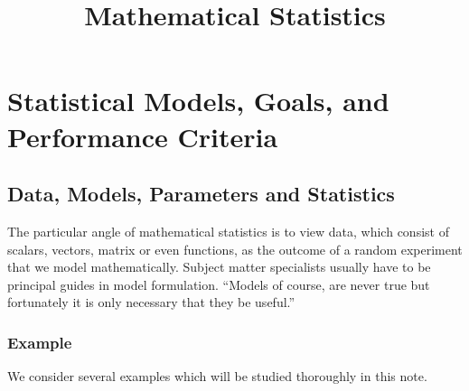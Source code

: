 \documentclass{article}
\title{Mathematical Statistics}
\begin{document}
\maketitle

\section{Statistical Models, Goals, and Performance Criteria}
\subsection{Data, Models, Parameters and Statistics}
The particular angle of mathematical statistics is to view data, which consist of scalars, vectors, matrix or even functions, as the outcome of a random experiment that we model mathematically. Subject matter specialists usually have to be principal guides in model formulation. ``Models of course, are never true but fortunately it is only necessary that they be useful.''
\subsubsection{Example}\label{sssec:example}
We consider several examples which will be studied thoroughly in this note. 
\end{document}
